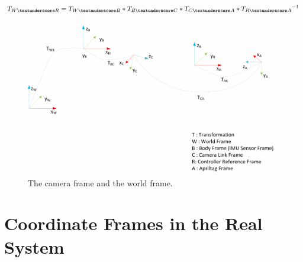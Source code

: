  
 
 \begin{equation}
 \label{TWR}
 T_{W\textunderscore R} = T_{W\textunderscore B} * T_{B\textunderscore C} * T_{C\textunderscore A} * {T_{R\textunderscore A}}^{-1}
 \end{equation}  
 
  \begin{figure}
     \centering
     \includegraphics[width=0.99\textwidth]{images/coordinate_frame_representation_v3.pdf}
     \caption{The camera frame and the world frame.}
     \label{pics:mavcoordinateframe}
  \end{figure}
  
  
\section{Coordinate Frames in the Real System}
\label{sec: CoordinatesinRealSystem}
  